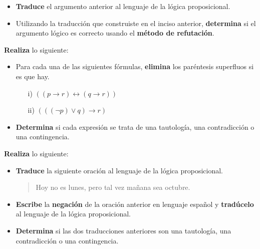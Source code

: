 \documentclass[oneside]{style}
\begin{document}
\begin{questions}[label=\protect\circled{\bfseries\arabic*}]
{\begin{itemize}
            \item \textbf{Traduce} el argumento anterior al lenguaje de la lógica 
            proposicional.
    
            \item Utilizando la traducción que construiste en el inciso anterior, 
            \textbf{determina} si el argumento lógico es correcto usando el 
            \textbf{método de refutación}.
        \end{itemize}
    }

    \question
    {
        \textbf{Realiza} lo siguiente:
        \begin{itemize}
            \item Para cada una de las siguientes fórmulas, \textbf{elimina} 
            los paréntesis superfluos si es que hay.
            \begin{itemize}
                \item[i)] $((p \rightarrow r) \leftrightarrow (q \rightarrow r))$
                \item[ii)] $(((\neg p) \lor q) \rightarrow r)$
            \end{itemize}
            
            \item \textbf{Determina} si cada expresión se trata de una 
            tautología, una contradicción o una contingencia.
        \end{itemize}
    }

    \question
    {
        \textbf{Realiza} lo siguiente:
        \begin{itemize}
            \item \textbf{Traduce} la siguiente oración al lenguaje de la 
            lógica proposicional. 

            \begin{quote}
                \centering
                Hoy no es lunes, pero tal vez mañana sea octubre.
            \end{quote}

            \item \textbf{Escribe} la \textbf{negación} de la oración anterior 
            en lenguaje español y \textbf{tradúcelo} al lenguaje de la lógica 
            proposicional.

            \item \textbf{Determina} si las dos traducciones anteriores son 
            una tautología, una contradicción o una contingencia. 
        \end{itemize}
    }


\end{questions}
\end{document}
